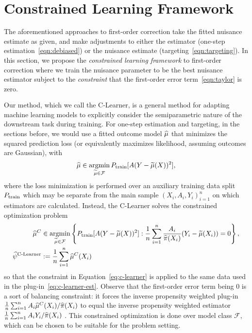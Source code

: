 \section{Constrained Learning Framework}
\label{sec:methods}

The aforementioned 
approaches to first-order 
correction take the fitted nuisance estimate as given,
and make adjustments to either the estimator 
(one-step estimation~\eqref{eqn:debiased}) or the nuisance estimate 
(targeting~\eqref{eqn:targeting}). 
In this section, we propose 
the \emph{constrained learning framework} to first-order 
correction where we train the nuisance parameter to 
be the best nuisance estimator subject to the \emph{constraint} that 
the first-order error term~\eqref{eqn:taylor} is  zero. 

Our method, which we call the C-Learner, is a general 
method for adapting machine learning 
models to explicitly consider the semiparametric nature of the 
downstream task during training. 
For one-step estimation and targeting, in the sections before, 
we would use a fitted outcome model $\widehat{\mu}$ that minimizes the squared prediction loss (or equivalently maximizes likelihood, assuming outcomes are Gaussian), 
with 
\vspace{-0.3em}
\begin{align}
\label{eq:regular_outcome}
\widehat{\mu} \in \mathop{\rm argmin}_{\widetilde{\mu} \in \mathcal{F}} P_{\rm train}[ A (Y - \widetilde{\mu}(X))^2],
\end{align}
where the loss minimization is performed over an auxiliary training data split $P_{\rm train}$ which may be separate from the main sample $(X_i, A_i, Y_i)_{i=1}^n$ on which estimators are calculated. Instead, the C-Learner solves the constrained optimization problem
\vspace{-0.3em}
\begin{align}
\label{eq:c-learner}
\widehat{\mu}^C
&\in \mathop{\rm argmin}_{\widetilde{\mu}\in\mathcal F} \left\{
P_{\rm train}[ A (Y - \widetilde{\mu}(X))^2] : 
\frac{1}{n} \sum_{i=1}^n 
\frac{A_i}{\widehat{\pi}(X_i)}
(Y_i-\widetilde{\mu}(X_i))=0
\right\}, 
\\
\widehat{\psi}^{\textrm {C-Learner}} 
&:= 
\frac{1}{n} \sum_{i=1}^n \widehat{\mu}^C(X_i)
\label{eq:c-learner-est}
\end{align}
so that the constraint in Equation~\eqref{eq:c-learner} is applied to the same data used in the plug-in~\eqref{eq:c-learner-est}. 
Observe that the first-order error term being 0 is a sort of balancing constraint: it forces the inverse propensity weighted plug-in $\frac{1}{n}\sum_{i=1}^n A_i\widehat{\mu}^C(X_i)/\widehat{\pi}(X_i)$ to equal the inverse propensity weighted estimator $\frac{1}{n}\sum_{i=1}^n A_iY_i/\widehat{\pi}(X_i)$ \citep{ding2023course}. 
This constrained optimization is done over model class $\mathcal F$, which can be chosen to be suitable for the problem setting. 

